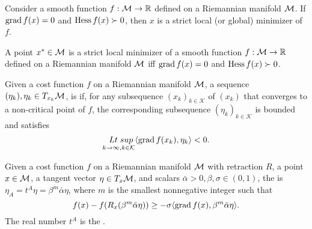 \documentclass[11pt,a4paper]{article}
\begin{document}
\begin{prop}
Consider a smooth function $f:\mathcal{M}\rightarrow \mathbb{R}$ defined on a Riemannian manifold $\mathcal{M}$. If $\text{grad}\, f(x) = 0$ and $\text{Hess}\, f(x) \succ 0$, then $x$ is a strict local (or global) minimizer of $f$.
\end{prop}

\begin{remark}\label{remark:second_order_optimality_conditions}
A point $x^*\in \mathcal{M}$ is a strict local minimizer of a smooth function $f:\mathcal{M}\rightarrow \mathbb{R}$ defined on a Riemannian manifold $\mathcal{M}$ iff $\text{grad}\, f(x) = 0$ and $\text{Hess}\, f(x) \succ 0$.
\end{remark}

\begin{mydef}
Given a cost function $f$ on a Riemannian manifold $\mathcal{M}$, a sequence $(\eta_k), \eta_k\in T_{x_k}\mathcal{M}$, is  if, for any subsequence $(x_k)_{k\in\mathcal{K}}$ of $(x_k)$ that converges to a non-critical point of $f$, the corresponding subsequence $(\eta_k)_{k\in\mathcal{K}}$ is bounded and satisfies
\begin{equation*}
\underset{k\rightarrow \infty,k\in\mathcal{K}}{\;\;Lt\;sup} \langle \text{grad}\, f(x_k), \eta_k \rangle < 0.
\end{equation*}
\end{mydef}

\begin{mydef}
Given a cost function $f$ on a Riemannian manifold $\mathcal{M}$ with retraction $R$, a point $x\in \mathcal{M}$, a tangent vector $\eta\in T_x\mathcal{M}$, and scalars $\bar{\alpha}>0,\beta,\sigma\in (0,1)$, the  is $\eta_A = t^A\eta = \beta^m\bar{\alpha}\eta$, where $m$ is the smallest nonnegative integer such that 
\begin{equation*}
f(x) - f(R_x(\beta^m\bar{\alpha}\eta)) \ge -\sigma\langle \text{grad}\, f(x), \beta^m\bar{\alpha}\eta \rangle.
\end{equation*}
The real number $t^A$ is the .
\end{mydef}
\end{document}
